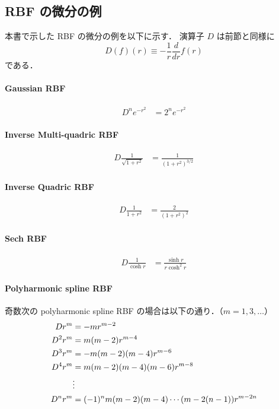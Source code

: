 \subsection{RBF の微分の例}\label{sec:interp_kernel_operators_rbf-differentiation-examples}

本書で示した RBF の微分の例を以下に示す．
演算子 $D$ は前節と同様に
\begin{equation}
    D(f)(r) \equiv -\frac{1}{r} \frac{d}{dr} f(r)
\end{equation}
である．

\paragraph{Gaussian RBF}
\begin{align}
    D^n e^{-r^2} & = 2^n e^{-r^2}
\end{align}

\paragraph{Inverse Multi-quadric RBF}
\begin{align}
    D \frac{1}{\sqrt{1 + r^2}} & = \frac{1}{(1 + r^2)^{3/2}}
\end{align}

\paragraph{Inverse Quadric RBF}
\begin{align}
    D \frac{1}{1 + r^2} & = \frac{2}{(1 + r^2)^2}
\end{align}

\paragraph{Sech RBF}
\begin{align}
    D \frac{1}{\cosh{r}} & = \frac{\sinh{r}}{r \cosh^2{r}}
\end{align}

\paragraph{Polyharmonic spline RBF}

奇数次の polyharmonic spline RBF の場合は以下の通り．（$m = 1, 3, \ldots$）
\begin{align}
    D r^m   & = -m r^{m-2}                                    \\
    D^2 r^m & = m(m-2) r^{m-4}                                \\
    D^3 r^m & = -m(m-2)(m-4) r^{m-6}                          \\
    D^4 r^m & = m(m-2)(m-4)(m-6) r^{m-8}                      \\
            & \vdots \notag                                   \\
    D^n r^m & = (-1)^n m(m-2)(m-4) \cdots (m-2(n-1)) r^{m-2n}
\end{align}

